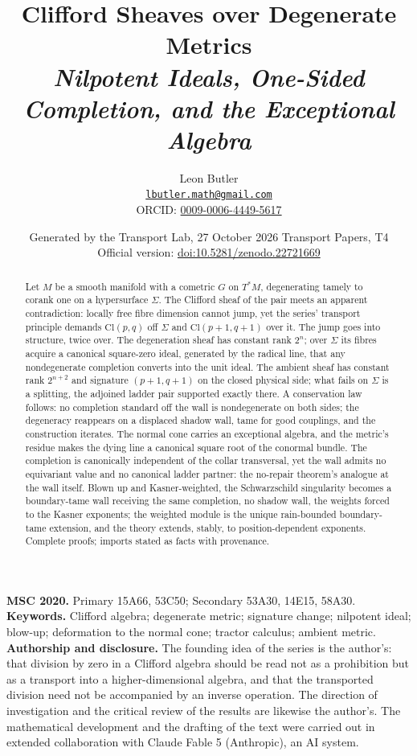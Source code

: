 \documentclass[11pt]{article}
\title{\bfseries Clifford Sheaves over Degenerate Metrics\\[4pt]\large\itshape Nilpotent Ideals, One-Sided Completion, and the Exceptional Algebra}
\author{Leon Butler\\ \normalsize\href{mailto:lbutler.math@gmail.com}{\texttt{lbutler.math@gmail.com}}\\ \normalsize ORCID: \href{https://orcid.org/0009-0006-4449-5617}{0009-0006-4449-5617}}
\date{Generated by the Transport Lab, 27 October 2026 \textperiodcentered{} Transport Papers, T4\\[3pt]\small Official version: \href{https://doi.org/10.5281/zenodo.22721669}{doi:10.5281/zenodo.22721669}}
\theoremstyle{definition}
\theoremstyle{plain}
\providecommand{\Cl}{}\renewcommand{\Cl}{\mathrm{Cl}}
\providecommand{\Sig}{}\renewcommand{\Sig}{\Sigma}
\begin{document}
\maketitle
\begin{abstract}
\normalsize
Let $M$ be a smooth manifold with a cometric $G$ on $T^*M$, degenerating tamely to corank one on a hypersurface $\Sig$. The Clifford sheaf of the pair meets an apparent contradiction: locally free fibre dimension cannot jump, yet the series' transport principle demands $\Cl(p,q)$ off $\Sig$ and $\Cl(p{+}1,q{+}1)$ over it. The jump goes into structure, twice over. The degeneration sheaf has constant rank $2^n$; over $\Sig$ its fibres acquire a canonical square-zero ideal, generated by the radical line, that any nondegenerate completion converts into the unit ideal. The ambient sheaf has constant rank $2^{n+2}$ and signature $(p{+}1,q{+}1)$ on the closed physical side; what fails on $\Sig$ is a splitting, the adjoined ladder pair supported exactly there. A conservation law follows: no completion standard off the wall is nondegenerate on both sides; the degeneracy reappears on a displaced shadow wall, tame for good couplings, and the construction iterates. The normal cone carries an exceptional algebra, and the metric's residue makes the dying line a canonical square root of the conormal bundle. The completion is canonically independent of the collar transversal, yet the wall admits no equivariant value and no canonical ladder partner: the no-repair theorem's analogue at the wall itself. Blown up and Kasner-weighted, the Schwarzschild singularity becomes a boundary-tame wall receiving the same completion, no shadow wall, the weights forced to the Kasner exponents; the weighted module is the unique rain-bounded boundary-tame extension, and the theory extends, stably, to position-dependent exponents. Complete proofs; imports stated as facts with provenance.
\end{abstract}
\medskip
\noindent\textbf{MSC 2020.} Primary 15A66, 53C50; Secondary 53A30, 14E15, 58A30.\\
\textbf{Keywords.} Clifford algebra; degenerate metric; signature change; nilpotent ideal; blow-up; deformation to the normal cone; tractor calculus; ambient metric.
\newpage
\noindent \textbf{Authorship and disclosure. }The founding idea of the series is the author's: that division by zero in a Clifford algebra should be read not as a prohibition but as a transport into a higher-dimensional algebra, and that the transported division need not be accompanied by an inverse operation. The direction of investigation and the critical review of the results are likewise the author's. The mathematical development and the drafting of the text were carried out in extended collaboration with Claude Fable 5 (Anthropic), an AI system.
\end{document}
